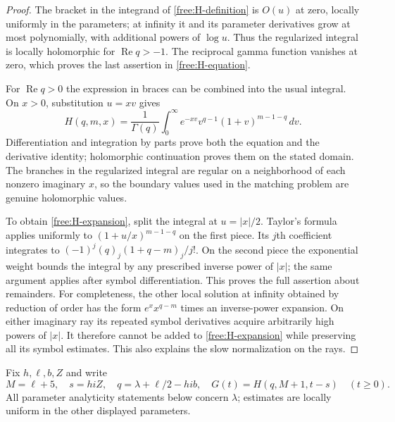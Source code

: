 \documentclass[11pt]{article}
\numberwithin{equation}{section}
\theoremstyle{definition}
\theoremstyle{remark}
\begin{document}
\begin{proof}
The bracket in the integrand of \eqref{free:H-definition} is $O(u)$ at
zero, locally uniformly in the parameters; at infinity it and its
parameter derivatives grow at most polynomially, with additional powers
of $\log u$.  Thus the regularized integral is locally holomorphic for
$\operatorname{Re}q>-1$.  The reciprocal gamma function vanishes at zero,
which proves the last assertion in \eqref{free:H-equation}.

For $\operatorname{Re}q>0$ the expression in braces can be combined into
the usual integral.  On $x>0$, substitution $u=xv$ gives
\[
 H(q,m,x)=\frac1{\Gamma(q)}\int_0^\infty
 e^{-xv}v^{q-1}(1+v)^{m-1-q}\,dv.
\]
Differentiation and integration by parts prove both the equation and the
derivative identity; holomorphic continuation proves them on the stated
domain.  The branches in the regularized integral are regular on a
neighborhood of each nonzero imaginary $x$, so the boundary values used
in the matching problem are genuine holomorphic values.

To obtain \eqref{free:H-expansion}, split the integral at $u=|x|/2$.
Taylor's formula applies uniformly to $(1+u/x)^{m-1-q}$ on the first
piece.  Its $j$th coefficient integrates to
$(-1)^j(q)_j(1+q-m)_j/j!$.  On the second piece the exponential weight
bounds the integral by any prescribed inverse power of $|x|$; the same
argument applies after symbol differentiation.  This proves the full
assertion about remainders.  For completeness, the other local solution
at infinity obtained by reduction of order has the form
$e^xx^{q-m}$ times an inverse-power expansion.  On either imaginary ray
its repeated symbol derivatives acquire arbitrarily high powers of
$|x|$.  It therefore cannot be added to \eqref{free:H-expansion} while
preserving all its symbol estimates.  This also explains the slow
normalization on the rays.
\end{proof}

Fix $h,\ell,b,Z$ and write
\[
 M=\ell+5,\quad s=hiZ,\quad q=\lambda+\ell/2-hi b,
 \quad G(t)=H(q,M+1,t-s)\quad(t\ge0).
\]
All parameter analyticity statements below concern $\lambda$; estimates
are locally uniform in the other displayed parameters.
\end{document}
